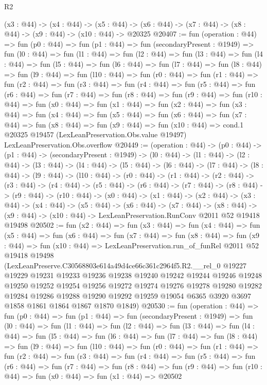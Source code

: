 \begin{lexlean}{R2}
\begin{coremodule}
  (x3 : @44) ->
  (x4 : @44) ->
  (x5 : @44) -> (x6 : @44) -> (x7 : @44) -> (x8 : @44) -> (x9 : @44) -> (x10 : @44) -> @20325
@20407 := fun (operation : @44) =>
  fun (p0 : @44) =>
  fun (p1 : @44) =>
  fun (secondaryPresent : @1949) =>
  fun (l0 : @44) =>
  fun (l1 : @44) =>
  fun (l2 : @44) =>
  fun (l3 : @44) =>
  fun (l4 : @44) =>
  fun (l5 : @44) =>
  fun (l6 : @44) =>
  fun (l7 : @44) =>
  fun (l8 : @44) =>
  fun (l9 : @44) =>
  fun (l10 : @44) =>
  fun (r0 : @44) =>
  fun (r1 : @44) =>
  fun (r2 : @44) =>
  fun (r3 : @44) =>
  fun (r4 : @44) =>
  fun (r5 : @44) =>
  fun (r6 : @44) =>
  fun (r7 : @44) =>
  fun (r8 : @44) =>
  fun (r9 : @44) =>
  fun (r10 : @44) =>
  fun (x0 : @44) =>
  fun (x1 : @44) =>
  fun (x2 : @44) =>
  fun (x3 : @44) =>
  fun (x4 : @44) =>
  fun (x5 : @44) =>
  fun (x6 : @44) =>
  fun (x7 : @44) =>
  fun (x8 : @44) =>
  fun (x9 : @44) =>
  fun (x10 : @44) =>
  cond.{1} @20325 @19457 (LexLeanPreservation.Obs.value @19497) LexLeanPreservation.Obs.overflow
@20449 := (operation : @44) ->
  (p0 : @44) ->
  (p1 : @44) ->
  (secondaryPresent : @1949) ->
  (l0 : @44) ->
  (l1 : @44) ->
  (l2 : @44) ->
  (l3 : @44) ->
  (l4 : @44) ->
  (l5 : @44) ->
  (l6 : @44) ->
  (l7 : @44) ->
  (l8 : @44) ->
  (l9 : @44) ->
  (l10 : @44) ->
  (r0 : @44) ->
  (r1 : @44) ->
  (r2 : @44) ->
  (r3 : @44) ->
  (r4 : @44) ->
  (r5 : @44) ->
  (r6 : @44) ->
  (r7 : @44) ->
  (r8 : @44) ->
  (r9 : @44) ->
  (r10 : @44) ->
  (x0 : @44) ->
  (x1 : @44) ->
  (x2 : @44) ->
  (x3 : @44) ->
  (x4 : @44) ->
  (x5 : @44) ->
  (x6 : @44) ->
  (x7 : @44) ->
  (x8 : @44) -> (x9 : @44) -> (x10 : @44) -> LexLeanPreservation.RunConv @2011 @52 @19418 @19498
@20502 := fun (x2 : @44) =>
  fun (x3 : @44) =>
  fun (x4 : @44) =>
  fun (x5 : @44) =>
  fun (x6 : @44) =>
  fun (x7 : @44) =>
  fun (x8 : @44) =>
  fun (x9 : @44) =>
  fun (x10 : @44) =>
  LexLeanPreservation.run_of_funRel
    @2011
    @52
    @19418
    @19498
    (LexLeanPreserve.C30568803e614a49d4ce66c361c2964f5.R2.__rel_0
      @19227
      @19229
      @19231
      @19233
      @19236
      @19238
      @19240
      @19242
      @19244
      @19246
      @19248
      @19250
      @19252
      @19254
      @19256
      @19272
      @19274
      @19276
      @19278
      @19280
      @19282
      @19284
      @19286
      @19288
      @19290
      @19292
      @19259
      @19054
      @6365
      @3920
      @3697
      @1858
      @1861
      @1864
      @1867
      @1870
      @1849)
@20530 := fun (operation : @44) =>
  fun (p0 : @44) =>
  fun (p1 : @44) =>
  fun (secondaryPresent : @1949) =>
  fun (l0 : @44) =>
  fun (l1 : @44) =>
  fun (l2 : @44) =>
  fun (l3 : @44) =>
  fun (l4 : @44) =>
  fun (l5 : @44) =>
  fun (l6 : @44) =>
  fun (l7 : @44) =>
  fun (l8 : @44) =>
  fun (l9 : @44) =>
  fun (l10 : @44) =>
  fun (r0 : @44) =>
  fun (r1 : @44) =>
  fun (r2 : @44) =>
  fun (r3 : @44) =>
  fun (r4 : @44) =>
  fun (r5 : @44) =>
  fun (r6 : @44) =>
  fun (r7 : @44) =>
  fun (r8 : @44) => fun (r9 : @44) => fun (r10 : @44) => fun (x0 : @44) => fun (x1 : @44) => @20502
\end{coremodule}
\end{lexlean}
